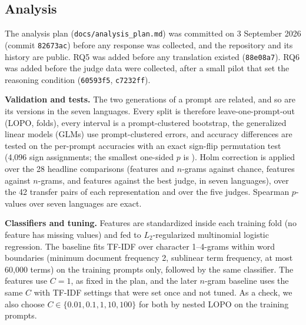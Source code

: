 \documentclass[conference,compsoc]{IEEEtran}
\begin{document}
\subsection{Analysis}
\label{sec:analysis}
The analysis plan (\texttt{docs/analysis\_plan.md}) was committed on 3 September 2026 (commit \texttt{82673ac}) before any response was collected, and the repository and its history are public. RQ5 was added before any translation existed (\texttt{88e08a7}). RQ6 was added before the judge data were collected, after a small pilot that set the reasoning condition (\texttt{60593f5}, \texttt{c7232ff}).

\textbf{Validation and tests.} The two generations of a prompt are related, and so are its versions in the seven languages. Every split is therefore leave-one-prompt-out (LOPO, \NPrompts{} folds), every interval is a prompt-clustered bootstrap, the generalized linear models (GLMs) use prompt-clustered errors, and accuracy differences are tested on the \NPrompts{} per-prompt accuracies with an exact sign-flip permutation test (4,096 sign assignments; the smallest one-sided $p$ is \PLMinP{}). Holm correction is applied over the 28 headline comparisons (features and $n$-grams against chance, features against $n$-grams, and features against the best judge, in seven languages), over the 42 transfer pairs of each representation and over the five judges. Spearman $p$-values over seven languages are exact.

\textbf{Classifiers and tuning.} Features are standardized inside each training fold (no feature has missing values) and fed to $L_2$-regularized multinomial logistic regression. The baseline fits TF-IDF over character 1--4-grams within word boundaries (minimum document frequency 2, sublinear term frequency, at most 60,000 terms) on the training prompts only, followed by the same classifier. The features use $C = 1$, as fixed in the plan, and the later $n$-gram baseline uses the same $C$ with TF-IDF settings that were set once and not tuned. As a check, we also choose $C \in \{0.01, 0.1, 1, 10, 100\}$ for both by nested LOPO on the training prompts.
\end{document}
